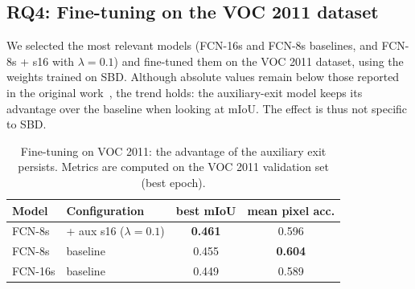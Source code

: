 \documentclass[runningheads]{llncs}
\begin{document}
    

     
    \subsection{RQ4: Fine-tuning on the VOC 2011 dataset}
    We selected the most relevant models (FCN-16s and FCN-8s baselines,
    and FCN-8s + s16 with $\lambda=0.1$) and fine-tuned them on the VOC 2011 dataset, using the weights trained on SBD. Although absolute values remain below those reported in the original work~\cite{ref_fcn}, the trend holds: the auxiliary-exit model keeps its advantage over the baseline when looking at mIoU. The effect is thus not specific to SBD.
    
    \begin{table}[h]
    \centering
    \caption{Fine-tuning on VOC 2011: the advantage of the auxiliary exit persists. Metrics are computed on the VOC 2011 validation set (best epoch).}
    \label{tab:voc}
    \begin{tabular}{llcc}
    \toprule
    Model & Configuration & best mIoU & mean pixel acc. \\
    \midrule
    FCN-8s  & + aux s16 ($\lambda{=}0.1$) & \textbf{0.461} & 0.596 \\
    FCN-8s  & baseline                    & 0.455 & \textbf{0.604} \\
    FCN-16s & baseline                    & 0.449 & 0.589 \\
    \bottomrule
    \end{tabular}
    \end{table}
\end{document}
